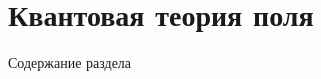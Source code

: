 \section{Квантовая теория поля}
\begin{frame}{Содержание раздела}
    \tableofcontents[currentsection, subsectionstyle=show/show/hide]
\end{frame}




